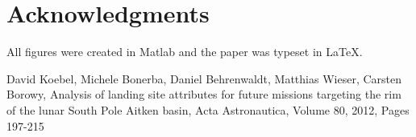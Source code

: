 \documentclass[prl,twocolumn]{revtex4-1}  %
\begin{document}
\section{ Acknowledgments}

 All figures were created in Matlab and the paper was typeset in \LaTeX.
\begin{acknowledgments}


\end{acknowledgments}

\begin{thebibliography}{99}

David Koebel, Michele Bonerba, Daniel Behrenwaldt, Matthias Wieser, Carsten Borowy,
Analysis of landing site attributes for future missions targeting the rim of the lunar South Pole Aitken basin,
Acta Astronautica,
Volume 80,
2012,
Pages 197-215



\end{thebibliography}
\end{document}
